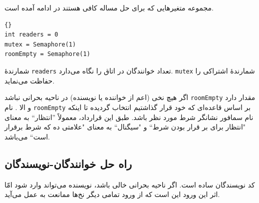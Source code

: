 \documentclass{book}
\newcommand{\clearemptydoublepage}{\newpage\cleardoublepage}
\begin{document}
    مجموعه متغیرهایی که برای حل مساله کافی هستند در ادامه آمده است. 

\begin{latin}
\begin{latin}
\begin{lstlisting}[title=\rl{مقداردهی اولیه خوانندگان-نویسندگان}]{}
int readers = 0
mutex = Semaphore(1)
roomEmpty = Semaphore(1)
\end{lstlisting}
\end{latin}
\end{latin}

    شمارندهٔ {\tt readers} تعداد خوانندگان در اتاق را نگاه می‌دارد.  {\tt mutex} شمارندهٔ اشتراکی را حفاظت می‌نماید. 

    
    اگر هیچ نخی (اعم از خواننده یا نویسنده) در ناحیه بحرانی نباشد {\tt roomEmpty}  مقدار  دارد و الا .
    نام {\tt roomEmpty}  بر اساس قاعده‌ای که خود قرار گذاشتیم انتخاب گردیده تا اینکه نام سمافور نشانگر شرط مورد نظر باشد. 
    طبق  این قرارداد، معمولاً ''انتظار`` به معنای "انتظار برای بر قرار بودن شرط`` و "سیگنال`` به معنای "علامتی ده که شرط برقرار است`` می‌باشد. 


\clearemptydoublepage
\subsection{راه حل خوانندگان-نویسندگان}

    کد نویسندگان ساده است. اگر ناحیه بحرانی خالی باشد، نویسنده می‌تواند وارد شود امّا  اثر این ورود این است که از ورود تمامی دیگر نخ‌ها ممانعت 
    به عمل می‌آید. 
\end{document}
